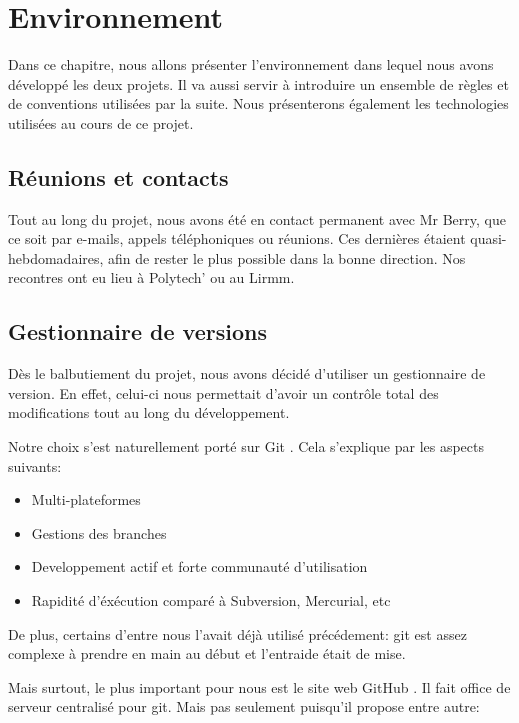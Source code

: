\chapter{Environnement}

Dans ce chapitre, nous allons présenter l'environnement dans lequel nous avons
développé les deux projets. Il va aussi servir à introduire un ensemble de
règles et de conventions utilisées par la suite.
Nous présenterons également les technologies utilisées au cours de ce projet.

\newpage

    \section{Réunions et contacts}

Tout au long du projet, nous avons été en contact permanent avec Mr Berry,
que ce soit par e-mails, appels téléphoniques ou réunions. Ces dernières
étaient quasi-hebdomadaires, afin de rester le plus possible dans la
bonne direction. Nos recontres ont eu lieu à Polytech' ou au Lirmm.

    \section{Gestionnaire de versions}

Dès le balbutiement du projet, nous avons décidé d'utiliser un gestionnaire
de version. En effet, celui-ci nous permettait d'avoir un contrôle total des modifications
tout au long du développement.

Notre choix s'est naturellement porté sur Git \cite{git}. Cela s'explique 
par les aspects suivants:

    \begin{itemize}
    \item Multi-plateformes
    \item Gestions des branches
    \item Developpement actif et forte communauté d'utilisation
    \item Rapidité d'éxécution comparé à Subversion, Mercurial, etc
    \end{itemize}

De plus, certains d'entre nous l'avait déjà utilisé précédement: git est assez
complexe à prendre en main au début et l'entraide était de mise.

Mais surtout, le plus important pour nous est le site web GitHub \cite{github}.
Il fait office de serveur centralisé pour git. Mais pas seulement puisqu'il 
propose entre autre:

